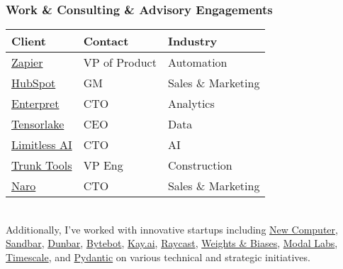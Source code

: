 {    \begin{frame}
        \frametitle{Work \& Consulting \& Advisory Engagements}
        \begin{tabular}{lll}
            \textbf{Client} & \textbf{Contact} & \textbf{Industry} \\
            \hline
            \textcolor{blue}{\href{https://zapier.com/}{Zapier}} & VP of Product & Automation \\
            \textcolor{blue}{\href{https://hubspot.com/}{HubSpot}} & GM & Sales \& Marketing \\
            \textcolor{blue}{\href{https://enterpret.com/}{Enterpret}} & CTO & Analytics \\
            \textcolor{blue}{\href{https://tensorlake.ai/}{Tensorlake}} & CEO & Data \\
            \textcolor{blue}{\href{http://limitless.ai/}{Limitless AI}} & CTO & AI \\
            \textcolor{blue}{\href{https://trunktools.com/}{Trunk Tools}} & VP Eng & Construction \\
            \textcolor{blue}{\href{http://narohq.com/}{Naro}} & CTO & Sales \& Marketing \\
        \end{tabular}
        \\
        \vspace{1em}
        Additionally, I've worked with innovative startups including \textcolor{blue}{\href{http://new.computer/}{New Computer}}, 
        \textcolor{blue}{\href{https://sandbar.inc/}{Sandbar}}, \textcolor{blue}{\href{https://trydunbar.com/}{Dunbar}}, 
        \textcolor{blue}{\href{https://bytebot.ai/}{Bytebot}}, \textcolor{blue}{\href{http://kay.ai/}{Kay.ai}}, 
        \textcolor{blue}{\href{https://raycast.com/}{Raycast}}, \textcolor{blue}{\href{https://wandb.ai/}{Weights \& Biases}}, 
        \textcolor{blue}{\href{https://modal.com/}{Modal Labs}}, \textcolor{blue}{\href{https://timescale.com/}{Timescale}}, 
        and \textcolor{blue}{\href{http://pydantic.dev/}{Pydantic}} on various technical and strategic initiatives.
    \end{frame}
    
}
